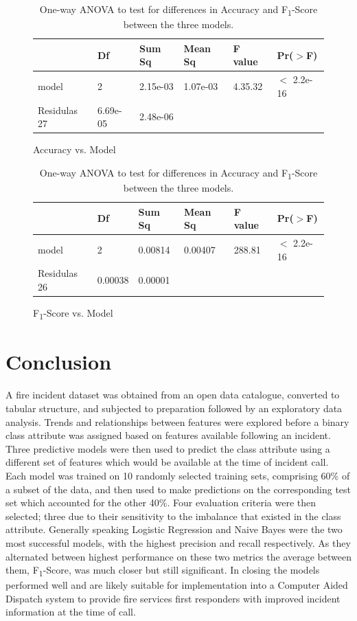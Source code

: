\documentclass[12pt,letterpaper, oneside]
{article}
\begin{document}
\begin{table}
	\begin{subfigure}[h]{\textwidth}
		\begin{tabular}{l l l l l l} \toprule
			& Df & Sum Sq & Mean Sq & F value & Pr($>$F) \\ \midrule
			model & 2 & 2.15e-03 & 1.07e-03 & 4.35.32 & $<$ 2.2e-16 \\
			Residulas 27 & 6.69e-05 & 2.48e-06 & & \\
		\end{tabular}
		\caption{
			Accuracy vs. Model
			\label{tab:anova-accuracy}
		}
	\end{subfigure}
	\begin{subfigure}[h]{\textwidth}
		\begin{tabular}{l l l l l l} \toprule
			& Df & Sum Sq & Mean Sq & F value & Pr($>$F) \\ \midrule
			model & 2 & 0.00814 & 0.00407 & 288.81 & $<$ 2.2e-16 \\
			Residulas 26 & 0.00038 & 0.00001 & & \\
		\end{tabular}
		\caption{
			F\textsubscript{1}-Score vs. Model
			\label{tab:anova-F1}
		}
	\end{subfigure}
	\caption{One-way ANOVA to test for differences in Accuracy and F\textsubscript{1}-Score between the three models.}

\end{table}

\section{Conclusion}
A fire incident dataset was obtained from an open data catalogue, converted to tabular structure, and subjected to preparation followed by an exploratory data analysis. Trends and relationships between features were explored before a binary class attribute was assigned based on features available following an incident. Three predictive models were then used to predict the class attribute using a different set of features which would be available at the time of incident call. Each model was trained on 10 randomly selected training sets, comprising 60\% of a subset of the data, and then used to make predictions on the corresponding test set which accounted for the other 40\%. Four evaluation criteria were then selected; three due to their sensitivity to the imbalance that existed in the class attribute. Generally speaking Logistic Regression and Naive Bayes were the two most successful models, with the highest precision and recall respectively. As they alternated between highest performance on these two metrics the average between them, F\textsubscript{1}-Score, was much closer but still significant. In closing the models performed well and are likely suitable for implementation into a Computer Aided Dispatch system to provide fire services first responders with improved incident information at the time of call.
\end{document}
